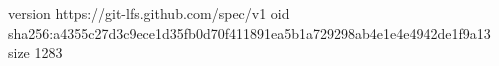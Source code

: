 version https://git-lfs.github.com/spec/v1
oid sha256:a4355c27d3c9ece1d35fb0d70f411891ea5b1a729298ab4e1e4e4942de1f9a13
size 1283
